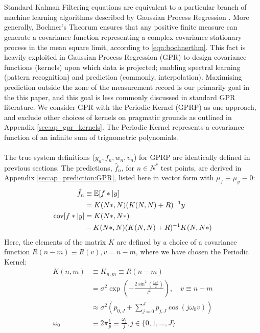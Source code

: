 \\
\\
Standard Kalman Filtering equations are equivalent to a particular branch of machine learning algorithms described by Gaussian Process Regression \cite{solin2014}. More generally, Bochner's Theorum ensures that any positive finite measure can generate a covariance function representing a complex covariance stationary process in the mean square limit, according to \eqref{eqn:bochnerthm}. This fact is heavily exploited in Gaussian Process Regression (GPR) to design covariance functions (kernels) upon which data is projected; enabling spectral learning (pattern recognition) and prediction (commonly, interpolation). Maximising prediction outside the zone of the measurement record is our primarily goal in the this paper, and this goal is less commonly discussed in standard GPR literature. We consider GPR with the Periodic Kernel (GPRP) as one approach, and exclude other choices of kernels on pragmatic grounds as outlined in Appendix \ref{sec:ap_gpr_kernels}. The Periodic Kernel represents a covariance function of an infinite sum of trignometric polynomials. 
\\
\\
The true system definitions ($y_n, f_n, w_n, v_n$) for GPRP are identically defined in previous sections. The predictions, $\hat{f}_n$, for $n \in N^*$ test points, are derived in Appendix \ref{sec:ap_prediction:GPR}, listed here in vector form with $\mu_f \equiv \mu_y \equiv 0$:
\begin{align}
\hat{f}_n &\equiv \mathbb{E}[f*|y] \\
& = K(N*,N)(K(N,N) + R )^{-1} y\\
\text{cov}[f*|y] &= K(N*,N*) \\
& - K(N*,N)(K(N,N) + R)^{-1}K(N,N*) 
\end{align}
Here, the elements of the matrix $K$ are defined by a choice of a covariance function $R(n-m)\equiv R(v), v = n-m$, where we have chosen the Periodic Kernel:
\begin{align}
K(n,m) & \equiv K_{n,m} \equiv R(n-m) \\
& = \sigma^2 \exp (- \frac{2\sin^2(\frac{\omega_0 v}{2})}{l^2}), \quad v \equiv n-m  \label{eqn:sec:main:GPRP_l} \\
&\approx \sigma^2 (p_{0,J} + \sum_{j=0}^{J} p_{j,J} \cos(j\omega_0 v)) \\
\omega_0 &\equiv 2 \pi \frac{1}{p} \equiv  \frac{\omega_j}{j}, j \in \{0, 1,..., J\}  \label{eqn:sec:main:GPRP_p}
\end{align}
